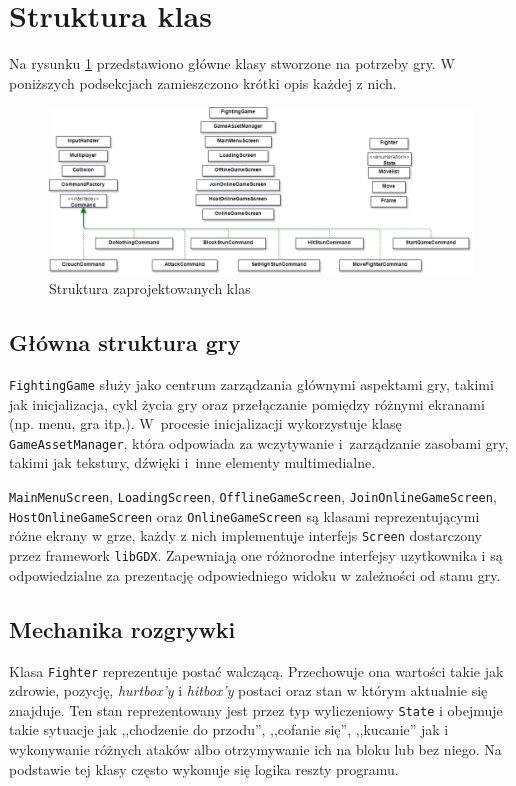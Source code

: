 \section{Struktura klas}
Na rysunku \ref{fig:struktura_klas} przedstawiono główne klasy stworzone na potrzeby gry. W poniższych podsekcjach zamieszczono krótki opis każdej z nich.
\begin{figure}[htb]
	\centering
		\includegraphics[width=1\linewidth]{rys03/struktura_klas}
	\caption{Struktura zaprojektowanych klas}
	\label{fig:struktura_klas}
\end{figure}

\subsection{Główna struktura gry}
\texttt{FightingGame} służy jako centrum zarządzania głównymi aspektami gry, takimi jak inicjalizacja, cykl życia gry oraz przełączanie pomiędzy różnymi ekranami (np. menu, gra itp.). W~procesie inicjalizacji wykorzystuje klasę \texttt{GameAssetManager}, która odpowiada za wczytywanie i~zarządzanie zasobami gry, takimi jak tekstury, dźwięki i~inne elementy multimedialne.

\texttt{MainMenuScreen}, \texttt{LoadingScreen}, \texttt{OfflineGameScreen}, \texttt{JoinOnlineGameScreen}, \texttt{HostOnlineGameScreen} oraz \texttt{OnlineGameScreen} są klasami reprezentującymi różne ekrany w grze, każdy z nich implementuje interfejs \texttt{Screen} dostarczony przez framework \texttt{libGDX}. Zapewniają one różnorodne interfejsy uzytkownika i są odpowiedzialne za prezentację odpowiedniego widoku w zależności od stanu gry.

\subsection{Mechanika rozgrywki}
Klasa \texttt{Fighter} reprezentuje postać walczącą. Przechowuje ona wartości takie jak zdrowie, pozycję, \emph{hurtbox'y} i \emph{hitbox'y} postaci oraz stan w którym aktualnie się znajduje. Ten stan reprezentowany jest przez typ wyliczeniowy \texttt{State} i obejmuje takie sytuacje jak ,,chodzenie do przodu'', ,,cofanie się'', ,,kucanie'' jak i wykonywanie różnych ataków albo otrzymywanie ich na bloku lub bez niego. Na podstawie tej klasy często wykonuje się logika reszty programu. 

